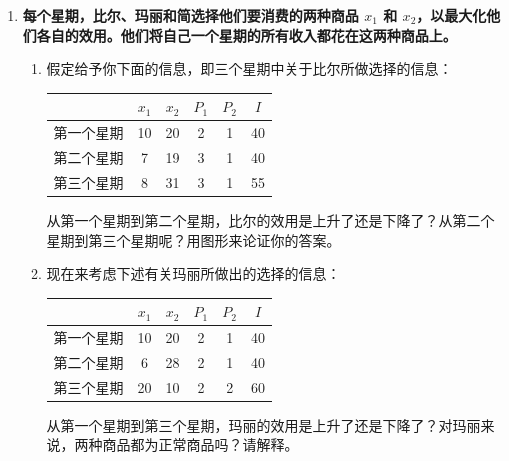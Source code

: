 \begin{enumerate}[label=\textbf{\arabic*.}, leftmargin=*]
\begin{center}
		\end{center}
		\newpage
		
		\item \textbf{每个星期，比尔、玛丽和简选择他们要消费的两种商品 $x_1$ 和 $x_2$，以最大化他们各自的效用。他们将自己一个星期的所有收入都花在这两种商品上。}
		
		
		\begin{enumerate}
			\item[a.] 假定给予你下面的信息，即三个星期中关于比尔所做选择的信息：
			\begin{center}
				\begin{tabular}{lccccc}
					\toprule
					& $x_1$ & $x_2$ & $P_1$ & $P_2$ & $I$  \\
					\midrule
					第一个星期   & 10    & 20    & 2     & 1     &  40    \\
					第二个星期   & 7     & 19    & 3     & 1     & 40   \\
					第三个星期   & 8     & 31    & 3     & 1     & 55   \\
					\bottomrule
				\end{tabular}
			\end{center}
			从第一个星期到第二个星期，比尔的效用是上升了还是下降了？从第二个星期到第三个星期呢？用图形来论证你的答案。
			
			\item[b.] 现在来考虑下述有关玛丽所做出的选择的信息：
			\begin{center}
				\begin{tabular}{lccccc}
					\toprule
					& $x_1$ & $x_2$ & $P_1$ & $P_2$ & $I$  \\
					\midrule
					第一个星期   & 10    & 20    & 2     & 1     &  40    \\
					第二个星期   & 6     & 28    & 2     & 1     & 40   \\
					第三个星期   & 20    & 10    & 2     & 2     & 60   \\
					\bottomrule
				\end{tabular}
			\end{center}
			从第一个星期到第三个星期，玛丽的效用是上升了还是下降了？对玛丽来说，两种商品都为正常商品吗？请解释。
			

\end{enumerate}
\end{enumerate}
